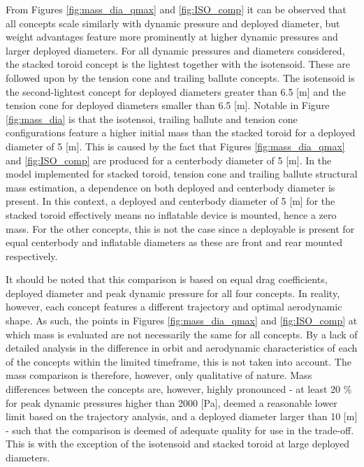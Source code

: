 From Figures \ref{fig:mass_dia_qmax} and \ref{fig:ISO_comp} it can be observed that all concepts scale similarly with dynamic pressure and deployed diameter, but weight advantages feature more prominently at higher dynamic pressures and larger deployed diameters. For all dynamic pressures and diameters considered, the stacked toroid concept is the lightest together with the isotensoid. These are followed upon by the tension cone and trailing ballute concepts. The isotensoid is the second-lightest concept for deployed diameters greater than 6.5 [m] and the tension cone for deployed diameters smaller than 6.5 [m]. Notable in Figure \ref{fig:mass_dia} is that the isotensoi, trailing ballute and tension cone configurations feature a higher initial mass than the stacked toroid for a deployed diameter of 5 [m]. This is caused by the fact that Figures \ref{fig:mass_dia_qmax} and \ref{fig:ISO_comp} are produced for a centerbody diameter of 5 [m]. In the model implemented for stacked toroid, tension cone and trailing ballute \cite{Samareh2011} structural mass estimation, a dependence on both deployed and centerbody diameter is present. In this context, a deployed and centerbody diameter of 5 [m] for the stacked toroid effectively means no inflatable device is mounted, hence a zero mass. For the other concepts, this is not the case since a deployable is present for equal centerbody and inflatable diameters as these are front and rear mounted respectively.

It should be noted that this comparison is based on equal drag coefficients, deployed diameter and peak dynamic pressure for all four concepts. In reality, however, each concept features a different trajectory and optimal aerodynamic shape. As such, the points in Figures \ref{fig:mass_dia_qmax} and \ref{fig:ISO_comp} at which mass is evaluated are not necessarily the same for all concepts. By a lack of detailed analysis in the difference in orbit and aerodynamic characteristics of each of the concepts within the limited timeframe, this is not taken into account. The mass comparison is therefore, however, only qualitative of nature. Mass differences between the concepts are, however, highly pronounced - at least 20 $\%$ for peak dynamic pressures higher than 2000 [Pa], deemed a reasonable lower limit based on the trajectory analysis, and a deployed diameter larger than 10 [m] - such that the comparison is deemed of adequate quality for use in the trade-off. This is with the exception of the isotensoid and stacked toroid at large deployed diameters.

